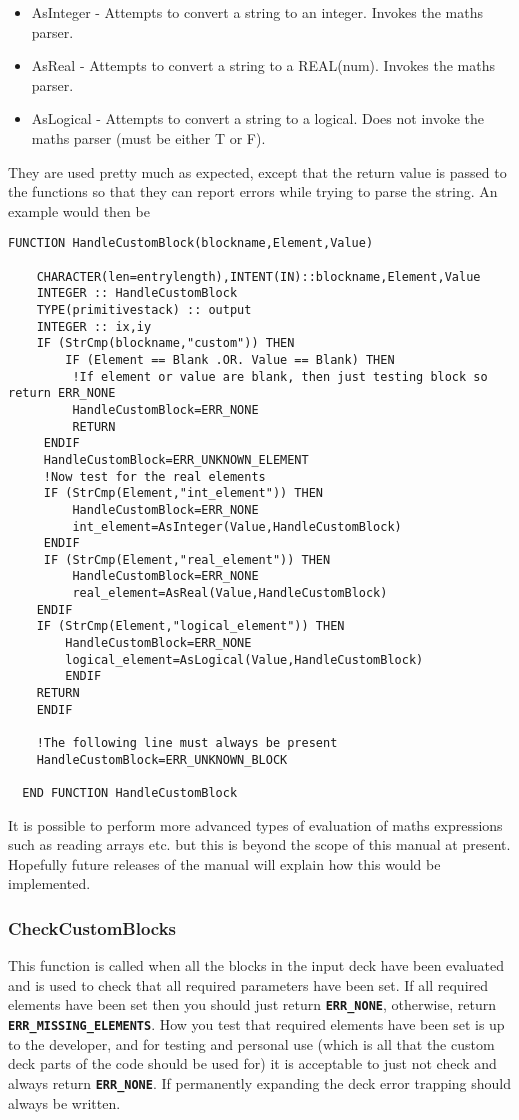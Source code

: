 \documentclass[12pt]{article}
\newcommand{\simpleboxverbatim}{\begin{Verbatim}[obeytabs=true,frame=single,
  framerule=0.5mm,rulecolor=\color{warwickmid}]}
\newcommand{\inlinecode}[1]{{\color{warwickred} \bf\texttt{#1}}}
\begin{document}
\begin{itemize}
\item AsInteger - Attempts to convert a string to an integer. Invokes the
  maths parser.
\item AsReal - Attempts to convert a string to a REAL(num). Invokes the maths
  parser.
\item AsLogical - Attempts to convert a string to a logical. Does not invoke
  the maths parser (must be either T or F).
\end{itemize}

They are used pretty much as expected, except that the return value is passed
to the functions so that they can report errors while trying to parse the
string. An example would then be

\simpleboxverbatim
  FUNCTION HandleCustomBlock(blockname,Element,Value)

    CHARACTER(len=entrylength),INTENT(IN)::blockname,Element,Value
    INTEGER :: HandleCustomBlock
    TYPE(primitivestack) :: output
    INTEGER :: ix,iy
    IF (StrCmp(blockname,"custom")) THEN
    	IF (Element == Blank .OR. Value == Blank) THEN
	     !If element or value are blank, then just testing block so return ERR_NONE
	     HandleCustomBlock=ERR_NONE
	     RETURN
	 ENDIF
	 HandleCustomBlock=ERR_UNKNOWN_ELEMENT
	 !Now test for the real elements
	 IF (StrCmp(Element,"int_element")) THEN
	     HandleCustomBlock=ERR_NONE
	     int_element=AsInteger(Value,HandleCustomBlock)
	 ENDIF
	 IF (StrCmp(Element,"real_element")) THEN
	     HandleCustomBlock=ERR_NONE
	     real_element=AsReal(Value,HandleCustomBlock)
	ENDIF
	IF (StrCmp(Element,"logical_element")) THEN
	    HandleCustomBlock=ERR_NONE
	    logical_element=AsLogical(Value,HandleCustomBlock)
	    ENDIF
	RETURN
    ENDIF

    !The following line must always be present
    HandleCustomBlock=ERR_UNKNOWN_BLOCK

  END FUNCTION HandleCustomBlock
\end{Verbatim}

It is possible to perform more advanced types of evaluation of maths
expressions such as reading arrays etc. but this is beyond the scope of this
manual at present. Hopefully future releases of the manual will explain how
this would be implemented.

\subsubsection{CheckCustomBlocks}
This function is called when all the blocks in the input deck have been
evaluated and is used to check that all required parameters have been set. If
all required elements have been set then you should just return
\inlinecode{ERR\_NONE}, otherwise, return
\inlinecode{ERR\_MISSING\_ELEMENTS}. How you test that required elements have
been set is up to the developer, and for testing and personal use (which is
all that the custom deck parts of the code should be used for) it is
acceptable to just not check and always return \inlinecode{ERR\_NONE}. If
permanently expanding the deck error trapping should always be written.
\end{document}
